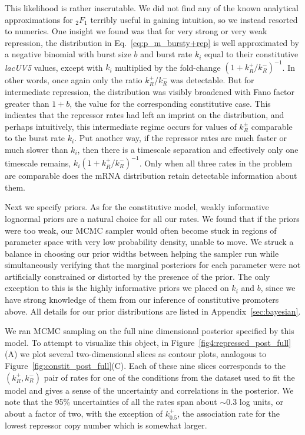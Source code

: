 This likelihood is rather inscrutable. We did not find any of the known
analytical approximations for ${_2F_1}$ terribly useful in gaining intuition, so
we instead resorted to numerics. One insight we found
was that for very strong or very weak repression, the distribution in
Eq.~\ref{eq:p_m_bursty+rep} is well approximated by a negative binomial with
burst size $b$ and burst rate $k_i$ equal to their constitutive \textit{lacUV5}
values, except with $k_i$ multiplied by the fold-change
$\left(1+k_R^+/k_R^-\right)^{-1}$. In other words, once again only the ratio
$k_R^+/k_R^-$ was detectable. But for intermediate repression, the distribution
was visibly broadened with Fano factor greater than $1+b$, the value for the
corresponding constitutive case. This indicates that the repressor rates had
left an imprint on the distribution, and perhaps intuitively, this intermediate
regime occurs for values of $k_R^\pm$ comparable to the burst rate $k_i$. Put
another way, if the repressor rates are much faster or much slower than $k_i$,
then there is a timescale separation and effectively only one timescale remains,
$k_i\left(1+k_R^+/k_R^-\right)^{-1}$. Only when all three rates in the problem
are comparable does the mRNA distribution retain detectable information about
them.

Next we specify priors. As for the constitutive model, weakly informative
lognormal priors are a natural choice for all our rates. We found that if the
priors were too weak, our MCMC sampler would often become stuck in regions of
parameter space with very low probability density, unable to move. We struck a
balance in choosing our prior widths between helping the sampler run while
simultaneously verifying that the marginal posteriors for each parameter were
not artificially constrained or distorted by the presence of the prior. The only
exception to this is the highly informative priors we placed on $k_i$ and $b$,
since we have strong knowledge of them from our inference of constitutive
promoters above. All details for our prior distributions are listed in 
Appendix~\ref{sec:bayesian}.

We ran MCMC sampling on the full nine dimensional posterior specified by this
model. To attempt to visualize this object, in
Figure~\ref{fig4:repressed_post_full}(A) we plot several two-dimensional slices
as contour plots, analogous to Figure~\ref{fig:constit_post_full}(C). Each of
these nine slices corresponds to the $(k_R^+, k_R^-)$ pair of rates for one of
the conditions from the dataset used to fit the model and gives a
sense of the uncertainty and correlations in the posterior.
We note that the 95\% uncertainties of all the rates span about $\sim0.3$
log units, or about a factor of two, with the exception of $k_{0.5}^+$, the
association rate for the lowest repressor copy number which is somewhat larger.

